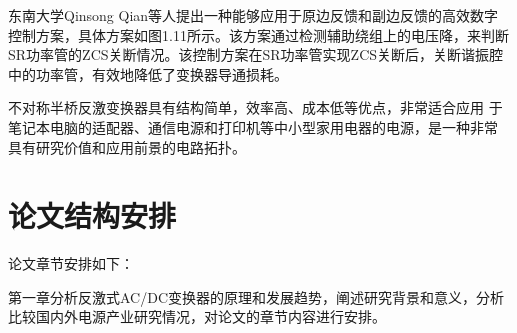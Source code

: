 东南大学Qinsong Qian等人提出一种能够应用于原边反馈和副边反馈的高效数字控制方案\cite{qian2022high_ZCS1}，具体方案如图1.11所示。该方案通过检测辅助绕组上的电压降，来判断SR功率管的ZCS关断情况。该控制方案在SR功率管实现ZCS关断后，关断谐振腔中的功率管，有效地降低了变换器导通损耗。

不对称半桥反激变换器具有结构简单，效率高、成本低等优点，非常适合应用 于笔记本电脑的适配器、通信电源和打印机等中小型家用电器的电源，是一种非常 具有研究价值和应用前景的电路拓扑。

\section{论文结构安排}


论文章节安排如下： 

第一章分析反激式AC/DC变换器的原理和发展趋势，阐述研究背景和意义，分析比较国内外电源产业研究情况，对论文的章节内容进行安排。 

